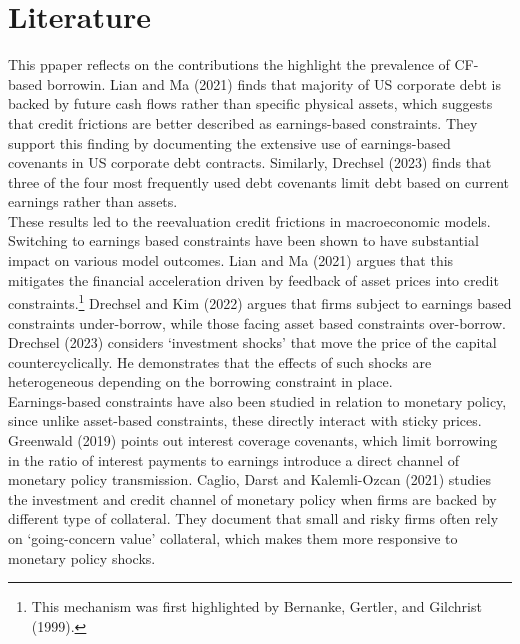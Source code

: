 \documentclass[12pt]{article}
\begin{document}
\section{Literature \label{sec:literature}} 
This ppaper reflects on the contributions the highlight the prevalence of CF-based borrowin. Lian and Ma (2021) finds that majority of US corporate debt is backed by future cash flows rather than specific physical assets, which suggests that credit frictions are better described as earnings-based constraints. They support this finding by documenting the extensive use of earnings-based covenants in US corporate debt contracts. Similarly, Drechsel (2023) finds that three of the four most frequently used debt covenants limit debt based on current earnings rather than assets. \vspace{3mm} \\
These results led to the reevaluation credit frictions in macroeconomic models. Switching to earnings based constraints have been shown to have substantial impact on various model outcomes. Lian and Ma (2021) argues that this mitigates the financial acceleration driven by feedback of asset prices into credit constraints.\footnote{This mechanism was first highlighted by Bernanke, Gertler, and Gilchrist (1999).} Drechsel and Kim (2022) argues that firms subject to earnings based constraints under-borrow, while those facing asset based constraints over-borrow. Drechsel (2023) considers `investment shocks' that move the price of the capital countercyclically. He demonstrates that the effects of such shocks are heterogeneous depending on the borrowing constraint in place.  \vspace{3mm} \\
Earnings-based constraints have also been studied in relation to monetary policy, since unlike asset-based constraints, these directly interact with sticky prices. Greenwald (2019) points out interest coverage covenants, which limit borrowing in the ratio of interest payments to earnings introduce a direct channel of monetary policy transmission. Caglio, Darst and Kalemli-Ozcan (2021) studies the investment and credit channel of monetary policy when firms are backed by different type of collateral. They document that small and risky firms often rely on `going-concern value' collateral, which makes them more responsive to monetary policy shocks. \vspace{3mm} \\
\end{document}
